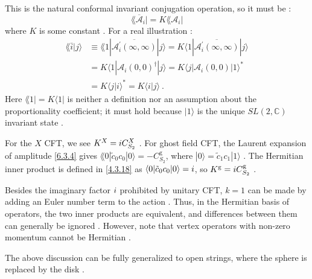 This is the natural conformal invariant conjugation operation, so it must be :
\begin{equation}
	\lAngle\overline{\mathscr{A}}_{i} |=K\lAngle\mathscr{A}_{i}| \label{6.7.32}
\end{equation}
where $K$ is some constant . For a real illustration :
\begin{align}
	\lAngle\bar{i} \vert j\rangle & 
	\equiv \lAngle 1 |\overline{\mathscr{A}_{i}^{\prime}(\infty, \infty)}| j\rangle
	=K \langle 1|\overline{\mathscr{A}_{i}^{\prime}(\infty, \infty)}| j\rangle  \nonumber \\
	&=K \langle 1 |\mathscr{A}_{i}(0,0)^{\dagger}| j\rangle=K\langle j|\mathscr{A}_{i}(0,0)| 1\rangle^{*} \nonumber \\
	&=K\langle j \vert i\rangle^{*} = K\langle i \vert j\rangle \:. \label{6.7.33}
\end{align}
Here $\lAngle 1|=K\langle 1|$ is neither a definition nor an assumption about the proportionality coefficient; it must hold because $|1\rangle$ is the unique $SL(2, \mathds{C})$ invariant state .

For the $X$ CFT, we see $K^{X}=i C_{S_{2}}^{X}$ . For ghost field CFT, the Laurent expansion of amplitude \eqref{6.3.4} gives $\lAngle 0|\tilde{c}_{0} c_{0}|0\rangle=-C_{S_{2}}^{\mathrm{g}}$, where $|0\rangle=\tilde{c}_{1} c_{1}|1\rangle$ . The Hermitian inner product is defined in \eqref{4.3.18} as $\langle 0|\tilde{c}_{0} c_{0}| 0\rangle=i$, so $K^{\mathrm{g}} = i C_{S_{2}}^{\mathrm{g}}$ .

Besides the imaginary factor $i$ prohibited by unitary CFT, $k=1$ can be made by adding an Euler number term to the action . Thus, in the Hermitian basis of operators, the two inner products are equivalent, and differences between them can generally be ignored . However, note that vertex operators with non-zero momentum cannot be Hermitian .

The above discussion can be fully generalized to open strings, where the sphere is replaced by the disk .